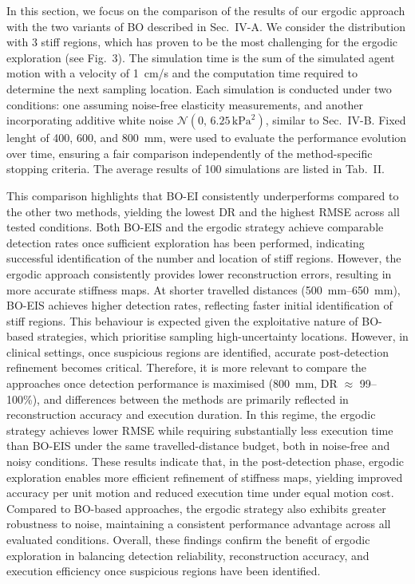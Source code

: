 \documentclass[11pt]{article}
\begin{document}
\noindent
In this section, we focus on the comparison of the results of our
ergodic approach with the two variants of BO described in
Sec.~IV-A. We consider the distribution with 3 stiff regions, which
has proven to be the most challenging for the ergodic exploration
(see Fig.~3). The simulation time is the sum of the simulated agent
motion with a velocity of 1~cm/s and the computation time required
to determine the next sampling location. Each simulation is
conducted under two conditions: one assuming noise-free elasticity
measurements, and another incorporating additive white noise
$\mathcal{N}(0,\,6.25\,\mathrm{kPa}^{2})$, similar to Sec.~IV-B.
Fixed lenght of 400, 600, and 800~mm, were used to evaluate the
performance evolution over time, ensuring a fair comparison
independently of the method-specific stopping criteria. The average
results of 100 simulations are listed in Tab.~II.

This comparison highlights that BO-EI consistently underperforms
compared to the other two methods, yielding the lowest DR and the
highest RMSE across all tested conditions. Both BO-EIS and the
ergodic strategy achieve comparable detection rates once sufficient
exploration has been performed, indicating successful identification
of the number and location of stiff regions. However, the ergodic
approach consistently provides lower reconstruction errors,
resulting in more accurate stiffness maps. At shorter travelled
distances (500~mm--650~mm), BO-EIS achieves higher detection rates,
reflecting faster initial identification of stiff regions. This
behaviour is expected given the exploitative nature of BO-based
strategies, which prioritise sampling high-uncertainty locations.
However, in clinical settings, once suspicious regions are
identified, accurate post-detection refinement becomes critical.
Therefore, it is more relevant to compare the approaches once
detection performance is maximised (800~mm, DR $\approx$ 99--100\%),
and differences between the methods are primarily reflected in
reconstruction accuracy and execution duration. In this regime, the
ergodic strategy achieves lower RMSE while requiring substantially
less execution time than BO-EIS under the same travelled-distance
budget, both in noise-free and noisy conditions. These results
indicate that, in the post-detection phase, ergodic exploration
enables more efficient refinement of stiffness maps, yielding
improved accuracy per unit motion and reduced execution time under
equal motion cost. Compared to BO-based approaches, the ergodic
strategy also exhibits greater robustness to noise, maintaining a
consistent performance advantage across all evaluated conditions.
Overall, these findings confirm the benefit of ergodic exploration
in balancing detection reliability, reconstruction accuracy, and
execution efficiency once suspicious regions have been identified.
\end{document}
